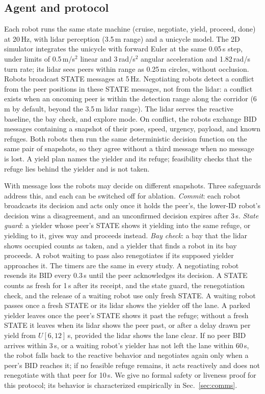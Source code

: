 \documentclass[letterpaper,journal]{IEEEtran}
\begin{document}
\subsection{Agent and protocol}\label{sec:proto}
Each robot runs the same state machine (cruise, negotiate, yield, proceed, done) at 20\,Hz, with lidar perception (3.5\,m range) and a unicycle model. The 2D simulator integrates the unicycle with forward Euler at the same 0.05\,s step, under limits of 0.5\,m/s$^2$ linear and 3\,rad/s$^2$ angular acceleration and 1.82\,rad/s turn rate; its lidar sees peers within range as 0.25\,m circles, without occlusion. Robots broadcast STATE messages at 5\,Hz. Negotiating robots detect a conflict from the peer positions in these STATE messages, not from the lidar: a conflict exists when an oncoming peer is within the detection range along the corridor (6\,m by default, beyond the 3.5\,m lidar range). The lidar serves the reactive baseline, the bay check, and explore mode. On conflict, the robots exchange BID messages containing a snapshot of their pose, speed, urgency, payload, and known refuges. Both robots then run the same deterministic decision function on the same pair of snapshots, so they agree without a third message when no message is lost. A yield plan names the yielder and its refuge; feasibility checks that the refuge lies behind the yielder and is not taken.

With message loss the robots may decide on different snapshots. Three safeguards address this, and each can be switched off for ablation. \emph{Commit}: each robot broadcasts its decision and acts only once it holds the peer's, the lower-ID robot's decision wins a disagreement, and an unconfirmed decision expires after 3\,s. \emph{State guard}: a yielder whose peer's STATE shows it yielding into the same refuge, or yielding to it, gives way and proceeds instead. \emph{Bay check}: a bay that the lidar shows occupied counts as taken, and a yielder that finds a robot in its bay proceeds. A robot waiting to pass also renegotiates if its supposed yielder approaches it. The timers are the same in every study. A negotiating robot resends its BID every 0.3\,s until the peer acknowledges its decision. A STATE counts as fresh for 1\,s after its receipt, and the state guard, the renegotiation check, and the release of a waiting robot use only fresh STATE. A waiting robot passes once a fresh STATE or its lidar shows the yielder off the lane. A parked yielder leaves once the peer's STATE shows it past the refuge; without a fresh STATE it leaves when its lidar shows the peer past, or after a delay drawn per yield from $U[6,12]$\,s, provided the lidar shows the lane clear. If no peer BID arrives within 3\,s, or a waiting robot's yielder has not left the lane within 60\,s, the robot falls back to the reactive behavior and negotiates again only when a peer's BID reaches it; if no feasible refuge remains, it acts reactively and does not renegotiate with that peer for 10\,s. We give no formal safety or liveness proof for this protocol; its behavior is characterized empirically in Sec.~\ref{sec:comms}.
\end{document}
